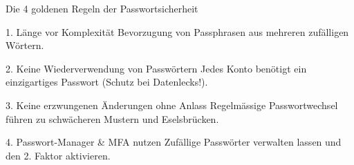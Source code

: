 \documentclass[10pt, aspectratio=169]{beamer}
\begin{document}
\begin{frame}{Die 4 goldenen Regeln der Passwortsicherheit}
  \pause
  \begin{block}{1. Länge vor Komplexität}
    Bevorzugung von Passphrasen aus mehreren zufälligen Wörtern.
  \end{block}
  \pause
  \begin{block}{2. Keine Wiederverwendung von Passwörtern}
    Jedes Konto benötigt ein einzigartiges Passwort (Schutz bei Datenlecks!).
  \end{block}
  \pause
  \begin{block}{3. Keine erzwungenen Änderungen ohne Anlass}
    Regelmässige Passwortwechsel führen zu schwächeren Mustern und Eselsbrücken.
  \end{block}
  \pause
  \begin{block}{4. Passwort-Manager \& MFA nutzen}
    Zufällige Passwörter verwalten lassen und den 2. Faktor aktivieren.
  \end{block}
\end{frame}
\end{document}
